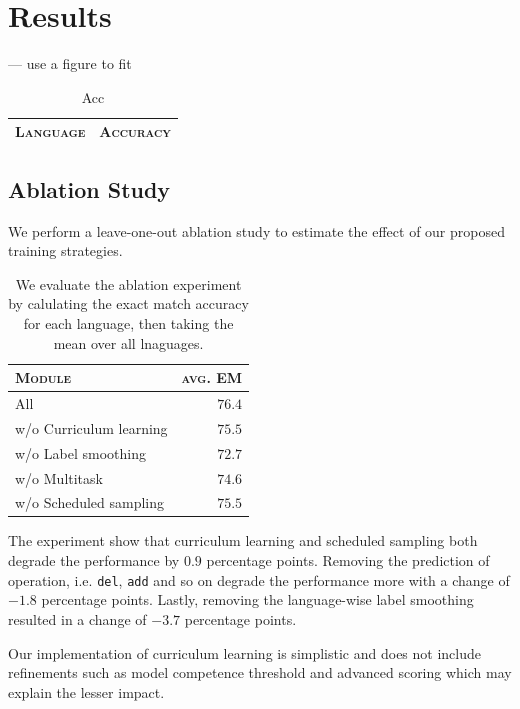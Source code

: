 \documentclass[11pt,a4paper]{article}
\newcommand\jp[1]{\textbf{JP: #1}}
\begin{document}
\section{Results}

--- use a figure to fit
\begin{table}[h]	
\centering
\begin{tabular}{lc}
\textsc{Language} & \textsc{Accuracy} \\
  \hline
  
\end{tabular} 
\caption{Acc}
\label{tab:accuracy}
\end{table}



\subsection{Ablation Study}

We perform a leave-one-out ablation study to estimate the effect of
our proposed training strategies.


\begin{table}[h]	
\centering
\begin{tabular}{lr}
\textsc{Module} & \textsc{avg. EM}\\
  \hline
  All  & $76.4$ \\
  w/o Curriculum learning & $75.5$\\
  w/o Label smoothing & $72.7$\\
  w/o Multitask & $74.6$ \\
  w/o Scheduled sampling & $75.5$ \\  
\end{tabular} 
\caption{We evaluate the ablation experiment by calulating the exact
match accuracy for each language, then taking the mean over all
lnaguages.}
\label{tab:abl}
\end{table}

The experiment show that curriculum learning and scheduled sampling
both degrade the performance by $0.9$ percentage points. Removing the
prediction of operation, i.e. \texttt{del}, \texttt{add} and so on
degrade the performance more with a change of $-1.8$ percentage
points. Lastly, removing the language-wise label smoothing resulted in
a change of $-3.7$ percentage points. 

Our implementation of curriculum learning is simplistic and does not
include refinements such as model competence threshold and advanced
scoring which may explain the lesser impact. 
\end{document}
